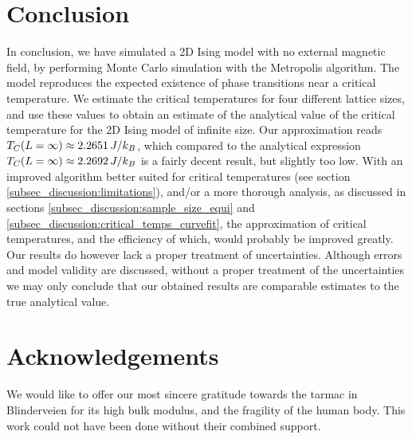 \section{Conclusion}\label{sec:conclusion}

In conclusion, we have simulated a 2D Ising model with no external magnetic field, by performing Monte Carlo simulation with the Metropolis algorithm. The model reproduces the expected existence of phase transitions near a critical temperature. We estimate the critical temperatures for four different lattice sizes, and use these values to obtain an estimate of the analytical value of the critical temperature for the 2D Ising model of infinite size. Our approximation reads $T_C(L=\infty) \approx 2.2651\,J/k_B$, which compared to the analytical expression $T_C(L=\infty)\approx 2.2692\,J/k_B$ is a fairly decent result, but slightly too low. With an improved algorithm better suited for critical temperatures (see section \ref{subsec_discussion:limitations}), and/or a more thorough analysis, as discussed in sections \ref{subsec_discussion:sample_size_equi} and \ref{subsec_discussion:critical_temps_curvefit}, the approximation of critical temperatures, and the efficiency of which, would probably be improved greatly. Our results do however lack a proper treatment of uncertainties. Although errors and model validity are discussed, without a proper treatment of the uncertainties we may only conclude that our obtained results are comparable estimates to the true analytical value.




\section{Acknowledgements}
We would like to offer our most sincere gratitude towards the tarmac in Blinderveien for its high bulk modulus, and the fragility of the human body. This work could not have been done without their combined support.   

